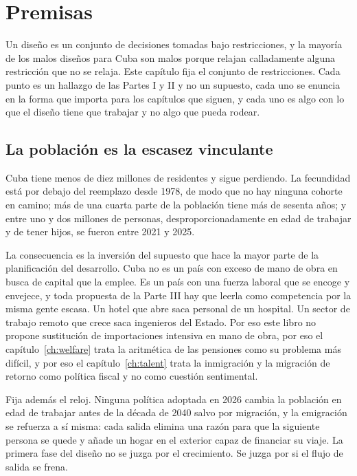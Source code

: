 \chapter{Premisas}
\label{ch:premises}

Un diseño es un conjunto de decisiones tomadas bajo restricciones, y la mayoría de
los malos diseños para Cuba son malos porque relajan calladamente alguna
restricción que no se relaja. Este capítulo fija el conjunto de restricciones.
Cada punto es un hallazgo de las Partes I y II y no un supuesto, cada uno se
enuncia en la forma que importa para los capítulos que siguen, y cada uno es algo
con lo que el diseño tiene que trabajar y no algo que pueda rodear.

\section{La población es la escasez vinculante}

Cuba tiene menos de diez millones de residentes y sigue perdiendo. La fecundidad
está por debajo del reemplazo desde 1978, de modo que no hay ninguna cohorte en
camino; más de una cuarta parte de la población tiene más de sesenta años; y entre
uno y dos millones de personas, desproporcionadamente en edad de trabajar y de
tener hijos, se fueron entre 2021 y 2025.

La consecuencia es la inversión del supuesto que hace la mayor parte de la
planificación del desarrollo. Cuba no es un país con exceso de mano de obra en
busca de capital que la emplee. Es un país con una fuerza laboral que se encoge y
envejece, y toda propuesta de la Parte III hay que leerla como competencia por la
misma gente escasa. Un hotel que abre saca personal de un hospital. Un sector de
trabajo remoto que crece saca ingenieros del Estado. Por eso este libro no propone
sustitución de importaciones intensiva en mano de obra, por eso el
capítulo~\ref{ch:welfare} trata la aritmética de las pensiones como su problema más
difícil, y por eso el capítulo~\ref{ch:talent} trata la inmigración y la migración
de retorno como política fiscal y no como cuestión sentimental.

Fija además el reloj. Ninguna política adoptada en 2026 cambia la población en edad
de trabajar antes de la década de 2040 salvo por migración, y la emigración se
refuerza a sí misma: cada salida elimina una razón para que la siguiente persona se
quede y añade un hogar en el exterior capaz de financiar su viaje. La primera fase
del diseño no se juzga por el crecimiento. Se juzga por si el flujo de salida se
frena.

